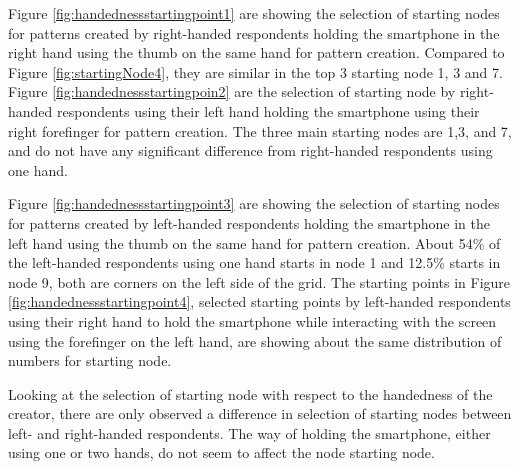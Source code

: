       Figure \ref{fig:handednessstartingpoint1} are showing the selection of starting nodes for patterns created by right-handed respondents holding the smartphone in the right hand using the thumb on the same hand for pattern creation. Compared to Figure \ref{fig:startingNode4}, they are similar in the top 3 starting node 1, 3 and 7. Figure \ref{fig:handednessstartingpoin2} are the selection of starting node by right-handed respondents using their left hand holding the smartphone using their right forefinger for pattern creation. The three main starting nodes are 1,3, and 7, and do not have any significant difference from right-handed respondents using one hand. 

      Figure \ref{fig:handednessstartingpoint3} are showing the selection of starting nodes for patterns created by left-handed respondents holding the smartphone in the left hand using the thumb on the same hand for pattern creation. About 54\% of the left-handed respondents using one hand starts in node 1 and 12.5\% starts in node 9, both are corners on the left side of the grid. The starting points in Figure \ref{fig:handednessstartingpoint4}, selected starting points by left-handed respondents using their right hand to hold the smartphone while interacting with the screen using the forefinger on the left hand, are showing about the same distribution of numbers for starting node.

      Looking at the selection of starting node with respect to the handedness of the creator, there are only observed a difference in selection of starting nodes between left- and right-handed respondents. The way of holding the smartphone, either using one or two hands, do not seem to affect the node starting node. 

      \clearpage

